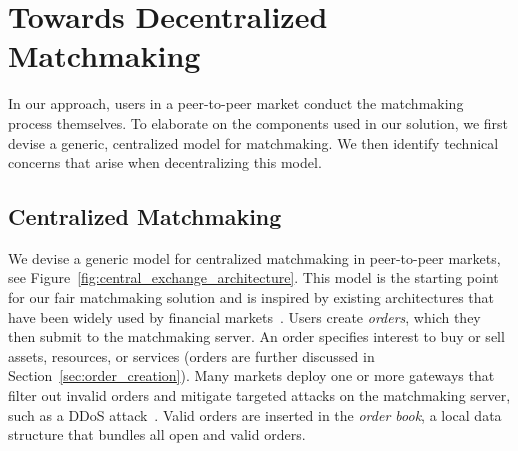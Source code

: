 \section{Towards Decentralized Matchmaking}
\label{sec:centralized_order_matchmaking}
In our approach, users in a peer-to-peer market conduct the matchmaking process themselves.
To elaborate on the components used in our solution, we first devise a generic, centralized model for matchmaking.
We then identify technical concerns that arise when decentralizing this model.

\subsection{Centralized Matchmaking}
We devise a generic model for centralized matchmaking in peer-to-peer markets, see Figure~\ref{fig:central_exchange_architecture}.
This model is the starting point for our fair matchmaking solution and is inspired by existing architectures that have been widely used by financial markets~\cite{mavroudis2019libra,veit2003matchmaking}.
Users create \emph{orders}, which they then submit to the matchmaking server.
An order specifies interest to buy or sell assets, resources, or services (orders are further discussed in Section~\ref{sec:order_creation}).
Many markets deploy one or more gateways that filter out invalid orders and mitigate targeted attacks on the matchmaking server, such as a DDoS attack~\cite{mavroudis2019libra}.
Valid orders are inserted in the \emph{order book}, a local data structure that bundles all open and valid orders.

